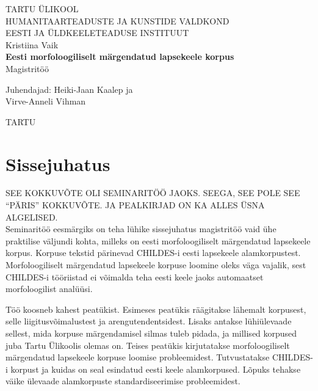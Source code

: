 \documentclass[12pt]{article}
\def\autor{Kristiina Vaik}
\def\pealkiri{Eesti morfoloogiliselt märgendatud lapsekeele korpus}
\begin{document}
\begin{titlepage}
    \begin{center}
        {\large TARTU ÜLIKOOL}\\[0.3cm]
        {\large HUMANITAARTEADUSTE JA KUNSTIDE VALDKOND}\\[0.3cm]
        {\large EESTI JA ÜLDKEELETEADUSE INSTITUUT}\\[0.3cm]

        \vfill
        {\large \autor}\\[0.3cm]
        {\large \textbf{\pealkiri}}\\[0.3cm]
        {\large Magistritöö}

        \vfill
        \begin{center}
        {\large
            Juhendajad: Heiki-Jaan Kaalep ja \\
            Virve-Anneli Vihman
        }
        \end{center}
        \vfill
        {\large TARTU \the\year}
    \end{center}
\end{titlepage}

\tableofcontents

\newpage
\cleardoublepage
{}
{}

\section*{Sissejuhatus}


SEE KOKKUVÕTE OLI SEMINARITÖÖ JAOKS. SEEGA, SEE POLE SEE ``PÄRIS'' KOKKUVÕTE. JA PEALKIRJAD ON KA ALLES ÜSNA ALGELISED.\\

Seminaritöö eesmärgiks on teha lühike sissejuhatus magistritöö vaid ühe praktilise väljundi kohta, milleks on eesti morfoloogiliselt märgendatud lapsekeele korpus. Korpuse tekstid pärinevad CHILDES-i eesti lapsekeele alamkorpustest. Morfoloogiliselt märgendatud lapsekeele korpuse loomine oleks väga vajalik, sest CHILDES-i tööriistad ei võimalda teha eesti keele jaoks automaatset morfoloogilist analüüsi.
 
Töö koosneb kahest peatükist. Esimeses peatükis räägitakse lähemalt korpusest, selle liigitusvõimalustest ja arengutendentsidest. Lisaks antakse lühiülevaade sellest, mida korpuse märgendamisel silmas tuleb pidada, ja millised korpused juba Tartu Ülikoolis olemas on. Teises peatükis kirjutatakse morfoloogiliselt märgendatud lapsekeele korpuse loomise probleemidest. Tutvustatakse CHILDES-i korpust ja kuidas on seal esindatud eesti keele alamkorpused. Lõpuks tehakse väike ülevaade alamkorpuste standardiseerimise probleemidest.
\end{document}
